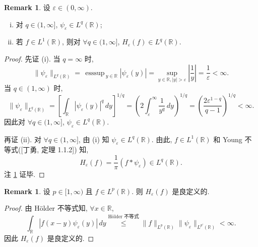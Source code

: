 \documentclass[a4paper,11pt]{article}
\theoremstyle{definition}
\newtheorem{remark}[theorem]{Remark}
\def \esssup {\mathop\mathrm{\,esssup\,}}
\begin{document}
\begin{remark} \label{remark1}
    设 $ \varepsilon \in (0, \infty) $. 
    \begin{enumerate}[(i)]
      \item 对 $ q \in (1, \infty] $, 
        $ \psi_\varepsilon \in L^q(\mathbb{R}) $;
      \item 若 $ f \in L^1(\mathbb{R}) $, 则对 $ \forall q \in (1, \infty] $, 
        $ H_\varepsilon (f) \in L^q(\mathbb{R}) $.
    \end{enumerate}
\end{remark} 

\begin{proof}
    先证 (i). 当 $ q = \infty $ 时,
    $$
        \| \psi_\varepsilon \|_{L^q(\mathbb{R})}
            = \esssup_{y \in \mathbb{R}} | \psi_\varepsilon(y) |
            = \sup_{y \in \mathbb{R}, |y| > \varepsilon} \left| \frac{1}{y} \right|
            = \frac{1}{\varepsilon} < \infty.
    $$
    当 $ q \in (1, \infty) $ 时,
    $$
        \| \psi_\varepsilon \|_{L^q(\mathbb{R})}
            = \left[ \int_\mathbb{R} |\psi_\varepsilon(y)|^q \, dy \right]^{1/q}
            = \left( 2 \int_\varepsilon^\infty \frac{1}{y^q} \, dy \right)^{1/q}  
            = \left( \frac{2 \varepsilon^{1 - q}}{q - 1} \right)^{1/q}  
            < \infty.
    $$
    因此对 $ \forall q \in (1, \infty] $, $ \psi_\varepsilon \in L^q(\mathbb{R}) $.
    
    再证 (ii). 对 $ \forall q \in (1, \infty] $, 
    由 (i) 知 $ \psi_\varepsilon \in L^q(\mathbb{R}) $.
    由此, $ f \in L^1(\mathbb{R}) $ 和 Young 不等式([丁勇, 定理 1.1.2]) 知,
    $$
        H_\varepsilon (f)
            = \frac{1}{\pi} (f * \psi_\varepsilon)
            \in L^q(\mathbb{R}).
    $$
    注 \ref{remark1} 证毕.
\end{proof}
  
\begin{remark} 
    设 $ p \in [1, \infty) $ 且 $ f \in L^p(\mathbb{R}) $. 则 $ H_\varepsilon (f) $ 是良定义的.
\end{remark}

\begin{proof}
    由 H\"older 不等式知, $ \forall x \in \mathbb{R} $,
    $$
        \int_\mathbb{R} | f(x - y) \psi_\varepsilon(y) | \, dy
            \overset{\text{H\"older 不等式}}{\leq} 
            \| f \|_{L^p(\mathbb{R})} \| \psi_\varepsilon \|_{L^{p'}(\mathbb{R})} < \infty.
    $$
    因此 $ H_\varepsilon (f) $ 是良定义的.
\end{proof}
\end{document}
